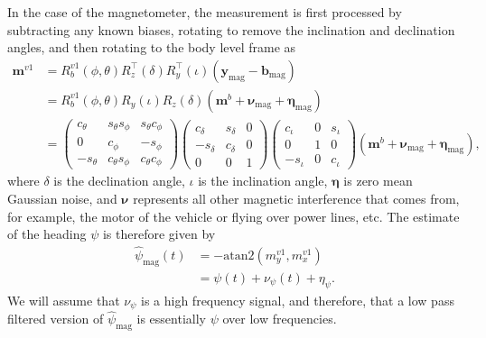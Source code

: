 In the case of the magnetometer, the measurement is first processed by subtracting any known biases, rotating to remove the inclination and declination angles, and then rotating to the body level frame as
\begin{align}
\mathbf{m}^{v1} &= R_b^{v1}(\phi, \theta) R_z^\top(\delta) R_y^\top(\iota) (\mathbf{y}_{\text{mag}}-\mathbf{b}_{\text{mag}}) \\
                &= R_b^{v1}(\phi, \theta) R_y(\iota) R_z(\delta) \left(\mathbf{m}^b + \boldsymbol{\nu}_{\text{mag}} + \boldsymbol{\eta}_{\text{mag}}\right) \\
                &= \begin{pmatrix}
    					c_\theta & s_\theta s_\phi & s_\theta c_\phi \\
					    0 & c_\phi & -s_\phi \\
					    -s_\theta & c_\theta s_\phi & c_\theta c_\phi \end{pmatrix}
					    \begin{pmatrix} c_\delta & s_\delta & 0 \\ -s_\delta & c_\delta & 0 \\ 0 & 0 & 1 \end{pmatrix}
					    \begin{pmatrix} c_\iota & 0 & s_\iota \\ 0 & 1 & 0 \\ -s_\iota & 0 & c_\iota \end{pmatrix}
					    \left(\mathbf{m}^b + \boldsymbol{\nu}_{\text{mag}} + \boldsymbol{\eta}_{\text{mag}}\right),
\end{align}
where $\delta$ is the declination angle, $\iota$ is the inclination angle, $\boldsymbol{\eta}$ is zero mean Gaussian noise, and $\boldsymbol{\nu}$ represents all other magnetic interference that comes from, for example, the motor of the vehicle or flying over power lines, etc.
The estimate of the heading $\psi$ is therefore given by
\begin{align*}
	\hat{\psi}_{\text{mag}}(t) &= - \text{atan2}(m_{y}^{v1},m_{x}^{v1}) \\
	                       &= \psi(t) + \nu_\psi(t) + \eta_\psi.
\end{align*}
We will assume that $\nu_\psi$ is a high frequency signal, and therefore, that a low pass filtered version of $\hat{\psi}_{\text{mag}}$ is essentially $\psi$ over low frequencies.

